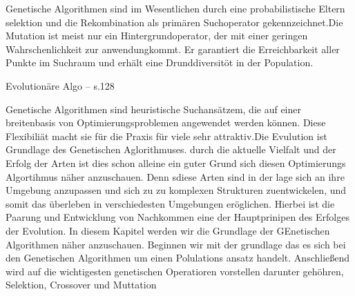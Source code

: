 \iffalse
Genetische Algorithmen sind im Wesentlichen durch eine probabilistische Eltern selektion und die Rekombination als primären Suchoperator gekennzeichnet.Die Mutation ist meist nur ein Hintergrundoperator, der mit einer geringen Wahrschenlichkeit zur anwendungkommt. Er garantiert die Erreichbarkeit aller Punkte im Suchraum und erhält eine Drunddiversitöt in der Population.

Evolutionäre Algo -- s.128


Genetische Algorithmen sind heuristische Suchansätzem, die auf einer breitenbasis von Optimierungsproblemen angewendet werden können. Diese Flexibiliät macht sie für die Praxis für viele sehr attraktiv.Die Evulution ist Grundlage des Genetischen Aglorithmuses. durch die aktuelle Vielfalt und der Erfolg der Arten ist dies schon alleine ein guter Grund sich diesen Optimierungs Algortihmus näher anzuschauen. Denn sdiese Arten sind in der lage sich an ihre Umgebung anzupassen und sich zu zu komplexen Strukturen zuentwickelen, und somit das überleben in verschiedesten Umgebungen eröglichen. Hierbei ist die Paarung und Entwicklung von Nachkommen eine der Hauptprinipen des Erfolges der Evolution. In diesem Kapitel werden wir die Grundlage der GEnetischen Algorithmen näher anzuschauen. Beginnen wir mit der grundlage das es sich bei den Genetischen Algorithmen um einen Polulations ansatz handelt. Anschließend wird auf die wichtigesten genetischen Operatioren vorstellen darunter gehöhren, Selektion, Crossover und Muttation

